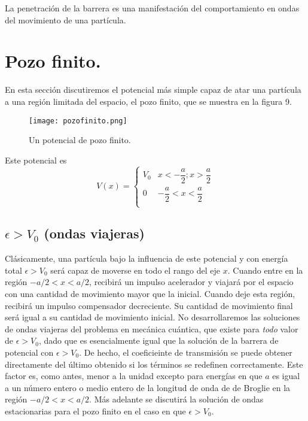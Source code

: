 \documentclass[12pt,a4paper]{article}
\def\e{{\epsilon}} %
\begin{document}
La penetración de la barrera es una manifestación del comportamiento en ondas del movimiento de una partícula.

\section{Pozo finito.}

En esta sección discutiremos el potencial más simple capaz de atar una partícula a una región limitada del espacio, el pozo finito, que se muestra en la figura 9.

\begin{figure}[ht!]
\begin{center}
\texttt{[image: pozofinito.png]}
\caption{Un potencial de pozo finito.}
\end{center}
\end{figure}

Este potencial es
\[
V(x)=
\left\{
\begin{array}{ll}
V_{0} & x<-\dfrac{a}{2}; x>\dfrac{a}{2} \\
0 & -\dfrac{a}{2}<x<\dfrac{a}{2} \\
\end{array}
\right.
\]

\subsection{$\e > V_{0}$ (ondas viajeras)}

Clásicamente, una partícula bajo la influencia de este potencial y con energía total $\e>V_{0}$ será capaz de moverse en todo el rango del eje $x$. Cuando entre en la región $-a/2<x<a/2$, recibirá un impulso acelerador y viajará por el espacio con una cantidad de movimiento mayor que la inicial. Cuando deje esta región, recibirá un impulso compensador decreciente. Su cantidad de movimiento final será igual a su cantidad de movimiento inicial. No desarrollaremos las soluciones de ondas viajeras del problema en mecánica cuántica, que existe para \emph{todo} valor de $\e>V_{0}$, dado que es esencialmente igual que la solución de la barrera de potencial con $\e>V_{0}$. De hecho, el coeficieinte de transmisión se puede obtener directamente del último obtenido si los términos se redefinen correctamente. Este factor es, como antes, menor a la unidad excepto para energías en que $a$ es igual a un número entero o medio entero de la longitud de onda de de Broglie en la región $-a/2<x<a/2$. Más adelante se discutirá la solución de ondas estacionarias para el pozo finito en el caso en que $\e>V_{0}$.
\end{document}
